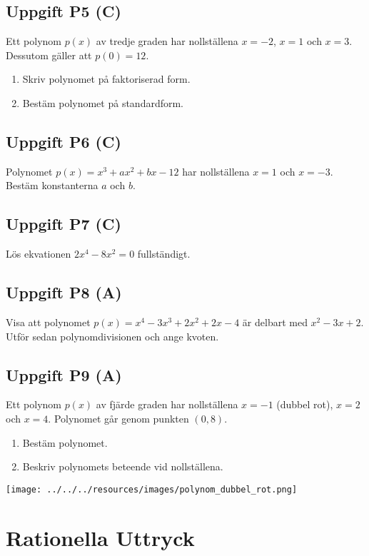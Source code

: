 \documentclass[12pt]{article}
\begin{document}
\subsection*{Uppgift P5 (C)}
Ett polynom $p(x)$ av tredje graden har nollställena $x = -2$, $x = 1$ och $x = 3$. Dessutom gäller att $p(0) = 12$.
\begin{enumerate}[label=\alph*)]
    \item Skriv polynomet på faktoriserad form.
    \item Bestäm polynomet på standardform.
\end{enumerate}

\subsection*{Uppgift P6 (C)}
Polynomet $p(x) = x^3 + ax^2 + bx - 12$ har nollställena $x = 1$ och $x = -3$. Bestäm konstanterna $a$ och $b$.

\subsection*{Uppgift P7 (C)}
Lös ekvationen $2x^4 - 8x^2 = 0$ fullständigt.

\subsection*{Uppgift P8 (A)}
Visa att polynomet $p(x) = x^4 - 3x^3 + 2x^2 + 2x - 4$ är delbart med $x^2 - 3x + 2$. Utför sedan polynomdivisionen och ange kvoten.

\subsection*{Uppgift P9 (A)}
Ett polynom $p(x)$ av fjärde graden har nollställena $x = -1$ (dubbel rot), $x = 2$ och $x = 4$. Polynomet går genom punkten $(0, 8)$.
\begin{enumerate}[label=\alph*)]
    \item Bestäm polynomet.
    \item Beskriv polynomets beteende vid nollställena.
\end{enumerate}

\begin{center}
\texttt{[image: ../../../resources/images/polynom\_dubbel\_rot.png]}
\end{center}

\newpage

\section{Rationella Uttryck}
\end{document}
